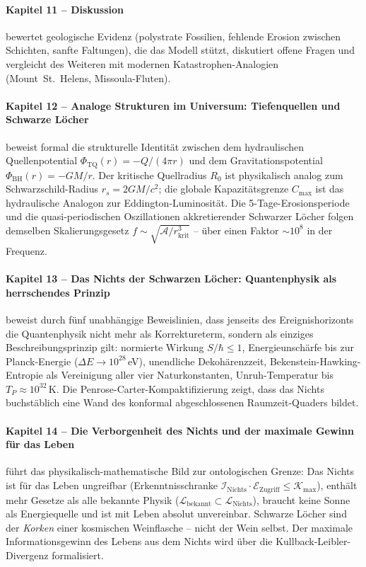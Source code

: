 ﻿\documentclass[12pt,a4paper]{report}
\begin{document}
\paragraph{Kapitel 11 -- Diskussion}
bewertet geologische Evidenz (polystrate Fossilien, fehlende Erosion zwischen Schichten, sanfte Faltungen), die das Modell stützt, diskutiert offene Fragen und vergleicht des Weiteren mit modernen Katastrophen-Analogien (Mount~St.~Helens, Missoula-Fluten).

\paragraph{Kapitel 12 -- Analoge Strukturen im Universum: Tiefenquellen und Schwarze Löcher}
beweist formal die strukturelle Identität zwischen dem hydraulischen Quellenpotential $\Phi_\mathrm{TQ}(r) = -Q/(4\pi r)$ und dem Gravitationspotential $\Phi_\mathrm{BH}(r) = -GM/r$. Der kritische Quellradius $R_0$ ist physikalisch analog zum Schwarzschild-Radius $r_s = 2GM/c^2$; die globale Kapazitätsgrenze $C_\mathrm{max}$ ist das hydraulische Analogon zur Eddington-Luminosität. Die 5-Tage-Erosionsperiode und die quasi-periodischen Oszillationen akkretierender Schwarzer Löcher folgen demselben Skalierungsgesetz $f \sim \sqrt{\mathcal{A}/r_\mathrm{krit}^3}$ -- über einen Faktor $\sim 10^8$ in der Frequenz.

\paragraph{Kapitel 13 -- Das Nichts der Schwarzen Löcher: Quantenphysik als herrschendes Prinzip}
beweist durch fünf unabhängige Beweislinien, dass jenseits des Ereignishorizonts die Quantenphysik nicht mehr als Korrektureterm, sondern als einziges Beschreibungsprinzip gilt: normierte Wirkung $S/\hbar \leq 1$, Energieunschärfe bis zur Planck-Energie ($\Delta E \to 10^{28}$\,eV), unendliche Dekohärenzzeit, Bekenstein-Hawking-Entropie als Vereinigung aller vier Naturkonstanten, Unruh-Temperatur bis $T_P \approx 10^{32}$\,K. Die Penrose-Carter-Kompaktifizierung zeigt, dass das Nichts buchstäblich eine Wand des konformal abgeschlossenen Raumzeit-Quaders bildet.

\paragraph{Kapitel 14 -- Die Verborgenheit des Nichts und der maximale Gewinn für das Leben}
führt das physikalisch-mathematische Bild zur ontologischen Grenze: Das Nichts ist für das Leben ungreifbar (Erkenntnisschranke $\mathcal{I}_\mathrm{Nichts}\cdot\mathcal{E}_\mathrm{Zugriff} \leq \mathcal{K}_\mathrm{max}$), enthält mehr Gesetze als alle bekannte Physik ($\mathcal{L}_\mathrm{bekannt} \subset \mathcal{L}_\mathrm{Nichts}$), braucht keine Sonne als Energiequelle und ist mit Leben absolut unvereinbar. Schwarze Löcher sind der \textit{Korken} einer kosmischen Weinflasche -- nicht der Wein selbst. Der maximale Informationsgewinn des Lebens aus dem Nichts wird über die Kullback-Leibler-Divergenz formalisiert.
\end{document}
